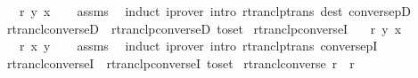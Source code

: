 \begin{isabellebody}
\ \ \ {\isachardoublequoteopen}r\isactrlsup {\isacharasterisk}{\kern0pt}\isactrlsup {\isacharasterisk}{\kern0pt}\ y\ x{\isachardoublequoteclose}\isanewline
%
\isadelimproof
\ \ %
\endisadelimproof
%
\isatagproof
{}\isamarkupfalse%
\ assms\ \isamarkupfalse%
\ induct\ {\isacharparenleft}{\kern0pt}iprover\ intro{\isacharcolon}{\kern0pt}\ rtranclp{\isacharunderscore}{\kern0pt}trans\ dest{\isacharbang}{\kern0pt}{\isacharcolon}{\kern0pt}\ conversepD{\isacharparenright}{\kern0pt}{\isacharplus}{\kern0pt}%
\endisatagproof
{\isafoldproof}%
%
\isadelimproof
\isanewline
%
\endisadelimproof
\isanewline
{}\isamarkupfalse%
\ rtrancl{\isacharunderscore}{\kern0pt}converseD\ {\isacharequal}{\kern0pt}\ rtranclp{\isacharunderscore}{\kern0pt}converseD\ {\isacharbrackleft}{\kern0pt}to{\isacharunderscore}{\kern0pt}set{\isacharbrackright}{\kern0pt}\isanewline
\isanewline
{}\isamarkupfalse%
\ rtranclp{\isacharunderscore}{\kern0pt}converseI{\isacharcolon}{\kern0pt}\isanewline
\ \ \ {\isachardoublequoteopen}r\isactrlsup {\isacharasterisk}{\kern0pt}\isactrlsup {\isacharasterisk}{\kern0pt}\ y\ x{\isachardoublequoteclose}\isanewline
\ \ \ {\isachardoublequoteopen}{\isacharparenleft}{\kern0pt}r{\isasyminverse}{\isasyminverse}{\isacharparenright}{\kern0pt}\isactrlsup {\isacharasterisk}{\kern0pt}\isactrlsup {\isacharasterisk}{\kern0pt}\ x\ y{\isachardoublequoteclose}\isanewline
%
\isadelimproof
\ \ %
\endisadelimproof
%
\isatagproof
{}\isamarkupfalse%
\ assms\ \isamarkupfalse%
\ induct\ {\isacharparenleft}{\kern0pt}iprover\ intro{\isacharcolon}{\kern0pt}\ rtranclp{\isacharunderscore}{\kern0pt}trans\ conversepI{\isacharparenright}{\kern0pt}{\isacharplus}{\kern0pt}%
\endisatagproof
{\isafoldproof}%
%
\isadelimproof
\isanewline
%
\endisadelimproof
\isanewline
{}\isamarkupfalse%
\ rtrancl{\isacharunderscore}{\kern0pt}converseI\ {\isacharequal}{\kern0pt}\ rtranclp{\isacharunderscore}{\kern0pt}converseI\ {\isacharbrackleft}{\kern0pt}to{\isacharunderscore}{\kern0pt}set{\isacharbrackright}{\kern0pt}\isanewline
\isanewline
{}\isamarkupfalse%
\ rtrancl{\isacharunderscore}{\kern0pt}converse{\isacharcolon}{\kern0pt}\ {\isachardoublequoteopen}{\isacharparenleft}{\kern0pt}r{\isasyminverse}{\isacharparenright}{\kern0pt}\isactrlsup {\isacharasterisk}{\kern0pt}\ {\isacharequal}{\kern0pt}\ {\isacharparenleft}{\kern0pt}r\isactrlsup {\isacharasterisk}{\kern0pt}{\isacharparenright}{\kern0pt}{\isasyminverse}{\isachardoublequoteclose}\isanewline

\end{isabellebody}
